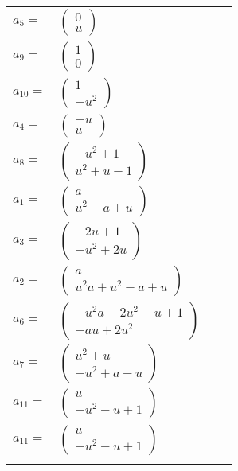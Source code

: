 \documentclass[1p]{elsarticle_modified}
\theoremstyle{definition}
\begin{document}
\begin{tabular}{m{7pt} m{180pt} m{7pt} m{180pt} }
\flushright $a_{5}=$&$\begin{pmatrix}0\\u\end{pmatrix}$ \\
\flushright $a_{9}=$&$\begin{pmatrix}1\\0\end{pmatrix}$ \\
\flushright $a_{10}=$&$\begin{pmatrix}1\\- u^2\end{pmatrix}$ \\
\flushright $a_{4}=$&$\begin{pmatrix}- u\\u\end{pmatrix}$ \\
\flushright $a_{8}=$&$\begin{pmatrix}- u^2+1\\u^2+u-1\end{pmatrix}$ \\
\flushright $a_{1}=$&$\begin{pmatrix}a\\u^2- a+u\end{pmatrix}$ \\
\flushright $a_{3}=$&$\begin{pmatrix}-2 u+1\\- u^2+2 u\end{pmatrix}$ \\
\flushright $a_{2}=$&$\begin{pmatrix}a\\u^2 a+u^2- a+u\end{pmatrix}$ \\
\flushright $a_{6}=$&$\begin{pmatrix}- u^2 a-2 u^2- u+1\\- a u+2 u^2\end{pmatrix}$ \\
\flushright $a_{7}=$&$\begin{pmatrix}u^2+u\\- u^2+a- u\end{pmatrix}$ \\
\flushright $a_{11}=$&$\begin{pmatrix}u\\- u^2- u+1\end{pmatrix}$\\ \flushright $a_{11}=$&$\begin{pmatrix}u\\- u^2- u+1\end{pmatrix}$\\&\end{tabular}
\end{document}
